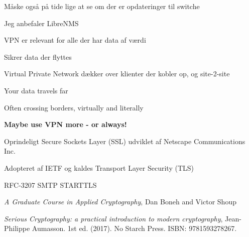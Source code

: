 \documentclass[Screen16to9,17pt]{foils}
\begin{document}


\begin{list2}
\item Måske også på tide lige at se om der er opdateringer til switche
\item Jeg anbefaler LibreNMS 
\end{list2}




\begin{list2}
\item VPN er relevant for alle der har data af værdi
\item Sikrer data der flyttes
\item Virtual Private Network dækker over klienter der kobler op, og site-2-site
\end{list2}




\begin{list2}
\item Your data travels far
\item Often crossing borders, virtually and literally
\end{list2}

\vskip 5mm
\centerline{\bf\Large Maybe use VPN more - or always!}







\begin{list1}
\item Oprindeligt Secure Sockets Layer (SSL) udviklet af Netscape Communications Inc.
\item Adopteret af IETF og kaldes Transport Layer Security (TLS)
\item RFC-3207 SMTP STARTTLS
\item \emph{A Graduate Course in
Applied Cryptography}, Dan Boneh   and   Victor Shoup
\\ 
\item \emph{Serious Cryptography: a practical introduction to modern cryptography}, Jean-Philippe
Aumasson. 1st ed. (2017). No Starch Press. ISBN: 9781593278267.
\end{list1}
\end{document}
